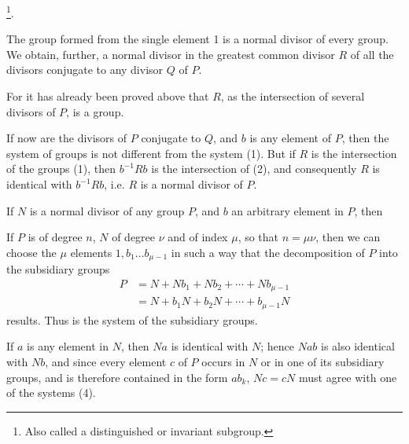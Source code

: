 
\footnote{Also called a distinguished or invariant subgroup.}.

The group formed from the single element 1 is a normal divisor of
every group. We obtain, further, a normal divisor in the greatest
common divisor $R$ of all the divisors conjugate to any divisor
$Q$ of $P$.

For it has already been proved above that $R$, as the intersection of
several divisors of $P$, is a group.

If now
are the divisors of $P$ conjugate to $Q$, and $b$ is any element of $P$,
then the system of groups
is not different from the system (1). But if $R$ is the intersection of the
groups (1), then $b^{-1}Rb$ is the intersection of (2), and consequently
$R$ is identical with $b^{-1}Rb$, i.e. $R$ is a normal divisor of $P$.

If $N$ is a normal divisor of any group $P$, and $b$ an arbitrary
element in $P$, then

If $P$ is of degree $n$, $N$ of degree $\nu$ and of index $\mu$, so that
$n = \mu\nu$, then we can choose the $\mu$ elements $1, b_1 \ldots b_{\mu-1}$ in
such a way that the decomposition of $P$ into the subsidiary groups
\[
\begin{aligned}
P &= N + Nb_1 + Nb_2 + \cdots + Nb_{\mu-1} \\
  &= N + b_1 N + b_2 N + \cdots + b_{\mu-1} N
\end{aligned}
\]
results. Thus
is the system of the subsidiary groups.

If $a$ is any element in $N$, then $Na$ is identical with $N$; hence
$Nab$ is also identical with $Nb$, and since every element $c$ of $P$
occurs in $N$ or in one of its subsidiary groups, and is therefore
contained in the form $ab_k$, $Nc = cN$ must agree with one of the
systems (4).

